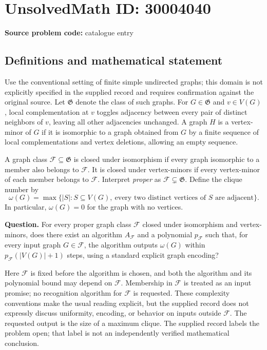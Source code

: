 \documentclass[11pt]{article}
\begin{document}
\section*{UnsolvedMath ID: 30004040}
\textbf{Source problem code:} catalogue entry
\subsection{Definitions and mathematical statement}
Use the conventional setting of finite simple undirected graphs; this domain is not explicitly specified in the supplied record and requires confirmation against the original source. Let \(\mathfrak G\) denote the class of such graphs. For \(G\in\mathfrak G\) and \(v\in V(G)\), local complementation at \(v\) toggles adjacency between every pair of distinct neighbors of \(v\), leaving all other adjacencies unchanged. A graph \(H\) is a vertex-minor of \(G\) if it is isomorphic to a graph obtained from \(G\) by a finite sequence of local complementations and vertex deletions, allowing an empty sequence.

A graph class \(\mathcal F\subseteq\mathfrak G\) is closed under isomorphism if every graph isomorphic to a member also belongs to \(\mathcal F\). It is closed under vertex-minors if every vertex-minor of each member belongs to \(\mathcal F\). Interpret \emph{proper} as \(\mathcal F\subsetneq\mathfrak G\). Define the clique number by
\[
\omega(G)=\max\bigl\{|S|:S\subseteq V(G),\ \text{every two distinct vertices of }S\text{ are adjacent}\bigr\}.
\]
In particular, \(\omega(G)=0\) for the graph with no vertices.

\textbf{Question.} For every proper graph class \(\mathcal F\) closed under isomorphism and vertex-minors, does there exist an algorithm \(A_{\mathcal F}\) and a polynomial \(p_{\mathcal F}\) such that, for every input graph \(G\in\mathcal F\), the algorithm outputs \(\omega(G)\) within \(p_{\mathcal F}(|V(G)|+1)\) steps, using a standard explicit graph encoding?

Here \(\mathcal F\) is fixed before the algorithm is chosen, and both the algorithm and its polynomial bound may depend on \(\mathcal F\). Membership in \(\mathcal F\) is treated as an input promise; no recognition algorithm for \(\mathcal F\) is requested. These complexity conventions make the usual reading explicit, but the supplied record does not expressly discuss uniformity, encoding, or behavior on inputs outside \(\mathcal F\). The requested output is the size of a maximum clique. The supplied record labels the problem open; that label is not an independently verified mathematical conclusion.
\end{document}
